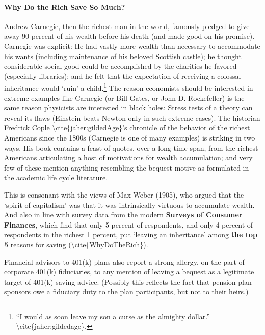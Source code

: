 \documentclass{article}
\begin{document}
\paragraph{Why Do the Rich Save So Much?}

Andrew Carnegie, then the richest man in the world, famously pledged to give away 90 percent of his wealth before his death (and made good on his promise). Carnegie was explicit: He had vastly more wealth than necessary to accommodate his wants (including maintenance of his beloved Scottish castle); he thought considerable social good could be accomplished by the charities he favored (especially libraries); and he felt that the expectation of receiving a colossal inheritance would `ruin' a child.\footnote{``I would as soon leave my son a curse as the almighty dollar.'' {\textbackslash}cite\{jaher:gildedage\}.} The reason economists should be interested in extreme examples like Carnegie (or Bill Gates, or John D. Rockefeller) is the same reason physicists are interested in black holes: Stress tests of a theory can reveal its flaws (Einstein beats Newton only in such extreme cases). The historian Fredrick Cople {\textbackslash}cite\{jaher:gildedAge\}'s chronicle of the behavior of the richest Americans since the 1800s (Carnegie is one of many examples) is striking in two ways. His book contains a feast of quotes, over a long time span, from the richest Americans articulating a host of motivations for wealth accumulation; and very few of these mention anything resembling the bequest motive as formulated in the academic life cycle literature.

This is consonant with the views of Max Weber (1905), who argued that the `spirit of capitalism' was that it was intrinsically virtuous to accumulate wealth. And also in line with survey data from the modern \textbf{Surveys of Consumer Finances}, which find that only 5 percent of respondents, and only 4 percent of respondents in the richest 1 percent, put `leaving an inheritance' among \textbf{the top 5} reasons for saving ({\textbackslash}cite\{WhyDoTheRich\}).

Financial advisors to 401(k) plans also report a strong allergy, on the part of corporate 401(k) fiduciaries, to any mention of leaving a bequest as a legitimate target of 401(k) saving advice. (Possibly this reflects the fact that pension plan sponsors owe a fiduciary duty to the plan participants, but not to their heirs.)

\end{document}
